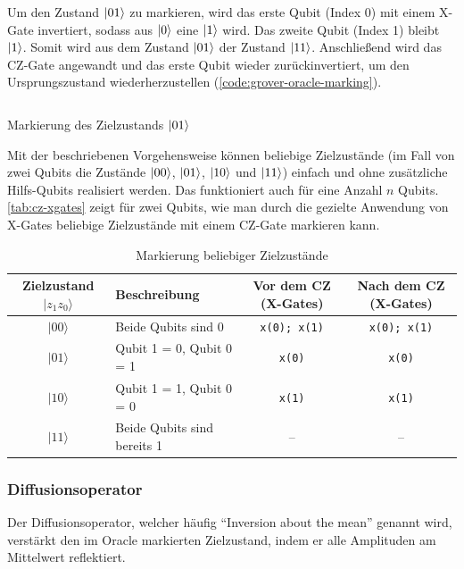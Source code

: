 Um den Zustand $\ket{01}$ zu markieren, wird das erste Qubit (Index 0) mit einem X-Gate invertiert, sodass aus $\ket{0}$ eine $\ket{1}$ wird. Das zweite Qubit (Index 1) bleibt $\ket{1}$. Somit wird aus dem Zustand $\ket{01}$ der Zustand $\ket{11}$. Anschließend wird das CZ-Gate angewandt und das erste Qubit wieder zurückinvertiert, um den Ursprungszustand wiederherzustellen (\autoref{code:grover-oracle-marking}).

\begin{listing}[ht!]
  \inputminted{python}{code/grover-oracle-marking.py}
  \caption{Markierung des Zielzustands $\ket{01}$}
  \label{code:grover-oracle-marking}
\end{listing}

Mit der beschriebenen Vorgehensweise können beliebige Zielzustände (im Fall von zwei Qubits die Zustände $\ket{00}$, $\ket{01}$, $\ket{10}$ und $\ket{11}$) einfach und ohne zusätzliche Hilfs-Qubits realisiert werden. Das funktioniert auch für eine Anzahl $n$ Qubits. \autoref{tab:cz-xgates} zeigt für zwei Qubits, wie man durch die gezielte Anwendung von X-Gates beliebige Zielzustände mit einem CZ-Gate markieren kann. \autocite{roy_deterministic_2022}

\begin{table}[ht!]
\centering
\begin{tabularx}{\textwidth}{|c|X|c|c|}
\hline
\textbf{Zielzustand $|z_1 z_0\rangle$} & \textbf{Beschreibung} & \textbf{Vor dem CZ (X-Gates)} & \textbf{Nach dem CZ (X-Gates)} \\
\hline
$|00\rangle$ & Beide Qubits sind 0 & \texttt{x(0); x(1)} & \texttt{x(0); x(1)} \\
\hline
$|01\rangle$ & Qubit 1 = 0, Qubit 0 = 1 & \texttt{x(0)} & \texttt{x(0)} \\
\hline
$|10\rangle$ & Qubit 1 = 1, Qubit 0 = 0 & \texttt{x(1)} & \texttt{x(1)} \\
\hline
$|11\rangle$ & Beide Qubits sind bereits 1 & – & – \\
\hline
\end{tabularx}
\caption{Markierung beliebiger Zielzustände}
\label{tab:cz-xgates}
\end{table}

\subsubsection*{Diffusionsoperator}

Der Diffusionsoperator, welcher häufig \enquote{Inversion about the mean} genannt wird, verstärkt den im Oracle markierten Zielzustand, indem er alle Amplituden am Mittelwert reflektiert.


